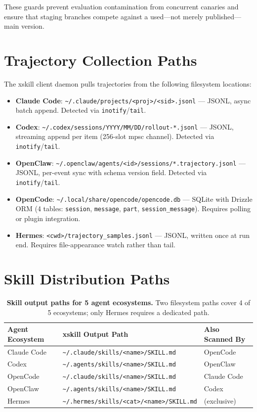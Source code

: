 \documentclass[11pt]{article}
\begin{document}
These guards prevent evaluation contamination from concurrent canaries and ensure that staging branches compete against a used---not merely published---main version.

\section{Trajectory Collection Paths}
\label{app:paths}

The xskill client daemon pulls trajectories from the following filesystem locations:

\begin{itemize}
    \item \textbf{Claude Code}: \texttt{\~{}/.claude/projects/<proj>/<sid>.jsonl} --- JSONL, async batch append. Detected via \texttt{inotify}/\texttt{tail}.
    \item \textbf{Codex}: \texttt{\~{}/.codex/sessions/YYYY/MM/DD/rollout-*.jsonl} --- JSONL, streaming append per item (256-slot mpsc channel). Detected via \texttt{inotify}/\texttt{tail}.
    \item \textbf{OpenClaw}: \texttt{\~{}/.openclaw/agents/<id>/sessions/*.trajectory.jsonl} --- JSONL, per-event sync with schema version field. Detected via \texttt{inotify}/\texttt{tail}.
    \item \textbf{OpenCode}: \texttt{\~{}/.local/share/opencode/opencode.db} --- SQLite with Drizzle ORM (4 tables: \texttt{session}, \texttt{message}, \texttt{part}, \texttt{session\_message}). Requires polling or plugin integration.
    \item \textbf{Hermes}: \texttt{<cwd>/trajectory\_samples.jsonl} --- JSONL, written once at run end. Requires file-appearance watch rather than tail.
\end{itemize}

\section{Skill Distribution Paths}
\label{app:distribution}

\begin{table}[h]
\centering
\caption{\textbf{Skill output paths for 5 agent ecosystems.} Two filesystem paths cover 4 of 5 ecosystems; only Hermes requires a dedicated path.}
\label{tab:distribution}
\small
\begin{tabular}{@{}lll@{}}
\toprule
\textbf{Agent Ecosystem} & \textbf{xskill Output Path} & \textbf{Also Scanned By} \\
\midrule
Claude Code & \texttt{\~{}/.claude/skills/<name>/SKILL.md} & OpenCode \\
Codex       & \texttt{\~{}/.agents/skills/<name>/SKILL.md} & OpenClaw \\
OpenCode    & \texttt{\~{}/.claude/skills/<name>/SKILL.md} & Claude Code \\
OpenClaw    & \texttt{\~{}/.agents/skills/<name>/SKILL.md} & Codex \\
Hermes      & \texttt{\~{}/.hermes/skills/<cat>/<name>/SKILL.md} & (exclusive) \\
\bottomrule
\end{tabular}
\end{table}
\end{document}
